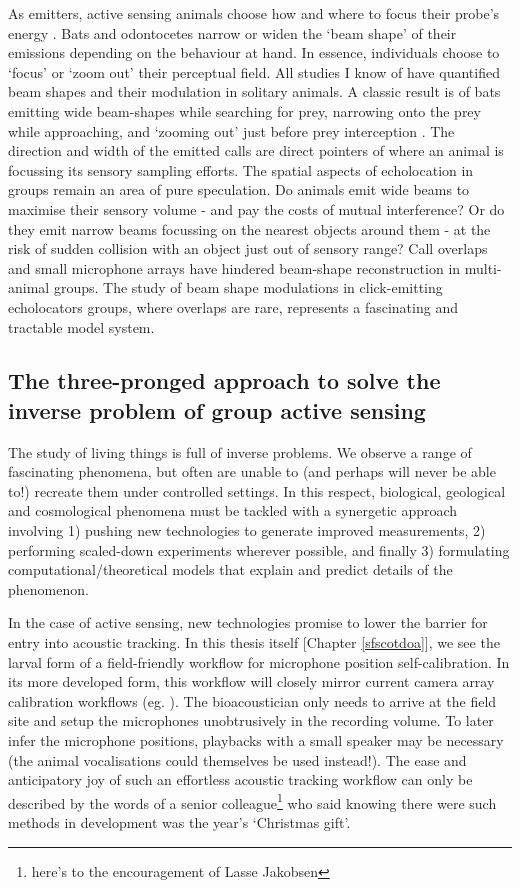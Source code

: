\documentclass[
]{book}
\begin{document}
As emitters, active sensing animals choose how and where to focus their probe's energy \citep{Fenton2014}. Bats and odontocetes narrow or widen the `beam shape' of their emissions depending on the behaviour at hand. In essence, individuals choose to `focus' or `zoom out' their perceptual field. All studies I know of have quantified beam shapes and their modulation in solitary animals. A classic result is of bats emitting wide beam-shapes while searching for prey, narrowing onto the prey while approaching, and `zooming out' just before prey interception \citep{Fenton2014}. The direction and width of the emitted calls are direct pointers of where an animal is focussing its sensory sampling efforts. The spatial aspects of echolocation in groups remain an area of pure speculation. Do animals emit wide beams to maximise their sensory volume - and pay the costs of mutual interference? Or do they emit narrow beams focussing on the nearest objects around them - at the risk of sudden collision with an object just out of sensory range? Call overlaps and small microphone arrays have hindered beam-shape reconstruction in multi-animal groups. The study of beam shape modulations in click-emitting echolocators groups, where overlaps are rare, represents a fascinating and tractable model system.

\hypertarget{threepronged}{%
\subsection{The three-pronged approach to solve the inverse problem of group active sensing}\label{threepronged}}

The study of living things is full of inverse problems. We observe a range of fascinating phenomena, but often are unable to (and perhaps will never be able to!) recreate them under controlled settings. In this respect, biological, geological and cosmological phenomena must be tackled with a synergetic approach involving 1) pushing new technologies to generate improved measurements, 2) performing scaled-down experiments wherever possible, and finally 3) formulating computational/theoretical models that explain and predict details of the phenomenon.

In the case of active sensing, new technologies promise to lower the barrier for entry into acoustic tracking. In this thesis itself {[}Chapter \ref{sfscotdoa}{]}, we see the larval form of a field-friendly workflow for microphone position self-calibration. In its more developed form, this workflow will closely mirror current camera array calibration workflows (eg. \citet{Theriault2014}). The bioacoustician only needs to arrive at the field site and setup the microphones unobtrusively in the recording volume. To later infer the microphone positions, playbacks with a small speaker may be necessary (the animal vocalisations could themselves be used instead!). The ease and anticipatory joy of such an effortless acoustic tracking workflow can only be described by the words of a senior colleague\footnote{here's to the encouragement of Lasse Jakobsen} who said knowing there were such methods in development was the year's `Christmas gift'.
\end{document}

